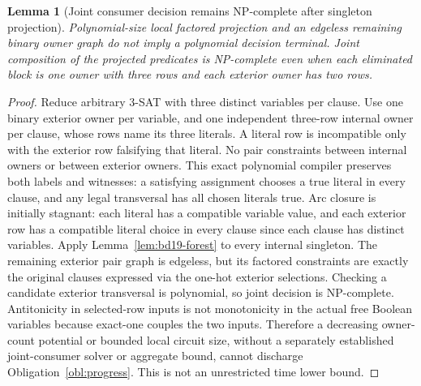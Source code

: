 \documentclass[11pt]{article}
\newtheorem{lemma}[theorem]{Lemma}
\begin{document}
\begin{lemma}[Joint consumer decision remains NP-complete after singleton projection]\label{lem:bd19-consumer}
Polynomial-size local factored projection and an edgeless remaining binary owner graph do not imply a polynomial decision terminal. Joint composition of the projected predicates is NP-complete even when each eliminated block is one owner with three rows and each exterior owner has two rows.
\end{lemma}
\begin{proof}
Reduce arbitrary 3-SAT with three distinct variables per clause. Use one binary exterior owner per variable, and one independent three-row internal owner per clause, whose rows name its three literals. A literal row is incompatible only with the exterior row falsifying that literal. No pair constraints between internal owners or between exterior owners. This exact polynomial compiler preserves both labels and witnesses: a satisfying assignment chooses a true literal in every clause, and any legal transversal has all chosen literals true. Arc closure is initially stagnant: each literal has a compatible variable value, and each exterior row has a compatible literal choice in every clause since each clause has distinct variables. Apply Lemma~\ref{lem:bd19-forest} to every internal singleton. The remaining exterior pair graph is edgeless, but its factored constraints are exactly the original clauses expressed via the one-hot exterior selections. Checking a candidate exterior transversal is polynomial, so joint decision is NP-complete. Antitonicity in selected-row inputs is not monotonicity in the actual free Boolean variables because exact-one couples the two inputs. Therefore a decreasing owner-count potential or bounded local circuit size, without a separately established joint-consumer solver or aggregate bound, cannot discharge Obligation~\ref{obl:progress}. This is not an unrestricted time lower bound.
\end{proof}
\end{document}
